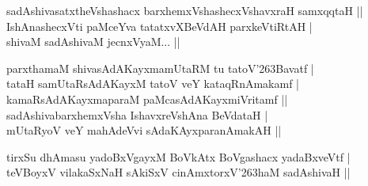 \begin{entry}
\begin{shl}
sadAshivasatxtheVshashacx barxhemxVshashecxVshavxraH samxqqtaH ||\\
IshAnashecxVti paMceYva tatatxvXBeVdAH parxkeVtiRtAH |\\
shivaM sadAshivaM jecnxVyaM... ||
\end{shl}
\begin{shl}
parxthamaM shivasAdAKayxmamUtaRM tu tatoV{\char'263}Bavatf |\\
tataH samUtaRsAdAKayxM tatoV veY kataqRnAmakamf |\\
kamaRsAdAKayxmaparaM paMcasAdAKayxmiVritamf ||\\
sadAshivabarxhemxVsha IshavxreVshAna BeVdataH |\\
mUtaRyoV veY mahAdeVvi sAdaKAyxparanAmakAH ||
\end{shl}
\begin{shl}
tirxSu dhAmasu yadoBxVgayxM BoVkAtx BoVgashacx yadaBxveVtf |\\
teVBoyxV vilakaSxNaH sAkiSxV cinAmxtorxV{\char'263}haM sadAshivaH ||
\end{shl}



\end{entry}
